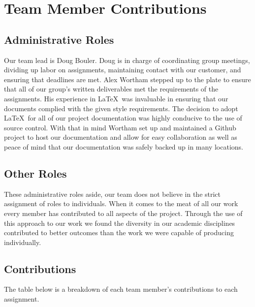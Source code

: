 \documentclass[12pt,letterpaper]{article}
\begin{document}
\section{Team Member Contributions}

\subsection{Administrative Roles}
Our team lead is Doug Bouler. Doug is in charge of coordinating group
meetings, dividing up labor on assignments, maintaining contact with our
customer, and ensuring that deadlines are met.  Alex Wortham stepped up to the
plate to ensure that all of our group's written deliverables met the
requirements of the assignments.  His experience in \LaTeX\ was invaluable in
ensuring that our documents complied with the given style requirements.  The
decision to adopt \LaTeX\ for all of our project documentation was highly
conducive to the use of source control.  With that in mind Wortham set up and
maintained a Github project to host our documentation and allow for easy
collaboration as well as peace of mind that our documentation was safely backed
up in many locations.

\subsection{Other Roles}
These administrative roles aside, our team does not
believe in the strict assignment of roles to individuals.  When it comes to the
meat of all our work every member has contributed to all aspects of the project.
Through the use of this approach to our work we found the diversity in our
academic disciplines contributed to better outcomes than the work we were
capable of producing individually. 


\clearpage
\subsection{Contributions}
The table below is a breakdown of each team member's contributions to each assignment.
\end{document}
